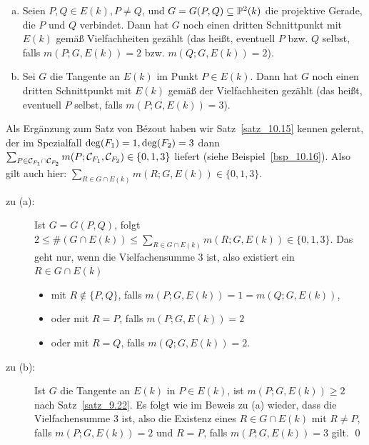 \begin{satz}
\label{satz_13.1}
	\begin{enumerate}[(a)]
		\item Seien $P,Q \in E(k), P \neq Q$, und $G=G(P,Q) \subseteq \mathbb{P}^2(k)$ die projektive Gerade, die $P$ und $Q$ verbindet. 
		Dann hat $G$ noch einen dritten Schnittpunkt mit $E(k)$ gemäß Vielfachheiten gezählt (das heißt, eventuell $P$ bzw. $Q$ selbst, falls $m(P;G,E(k)) = 2$ bzw. $m(Q;G,E(k)) = 2$).
		\item Sei $G$ die Tangente an $E(k)$ im Punkt $P \in E(k)$. 
		Dann hat $G$ noch einen dritten Schnittpunkt mit $E(k)$ gemäß der Vielfachheiten gezählt (das heißt, eventuell $P$ selbst, falls $m(P;G,E(k)) = 3$).
	\end{enumerate}
\end{satz}

\begin{bew}
	Als Ergänzung zum Satz von Bézout haben wir Satz~\ref{satz_10.15} kennen gelernt, der im Spezialfall $\deg(F_1) = 1,\linebreak \deg(F_2) = 3$ dann $\sum_{P \in \mathcal{C}_{F_1} \cap \mathcal{C}_{F_2}} m(P;\mathcal{C}_{F_1},\mathcal{C}_{F_2}) \in \{0,1,3\}$ liefert (siehe Beispiel~\ref{bsp_10.16}). 
	Also gilt auch hier: \linebreak $\sum_{R \in G \cap E(k)} m(R;G,E(k)) \in \{0,1,3\}$.
	\begin{description}
		\item[zu (a):] Ist $G = G(P,Q)$, folgt $2 \leq  \#(G \cap E(k)) \leq \sum_{R \in G \cap E(k)} m(R;G,E(k)) \in \{0,1,3\}$. 
		Das geht nur, wenn die Vielfachensumme $3$ ist, also existiert ein $R \in G \cap E(k)$ \begin{itemize}
			\item mit $R \notin \{P,Q\}$, falls $m(P;G,E(k)) = 1 = m(Q;G,E(k))$,
			\item oder mit $R = P$, falls $m(P;G,E(k)) = 2$
			\item oder mit $R = Q$, falls $m(Q;G,E(k)) = 2$.
		\end{itemize} 
		\item[zu (b):] Ist $G$ die Tangente an $E(k)$ in $P \in E(k)$, ist $m(P;G,E(k)) \geq 2$ nach Satz~\ref{satz_9.22}. 
		Es folgt wie im Beweis zu (a) wieder, dass die Vielfachensumme $3$ ist, also die Existenz eines $R \in G \cap E(k)$ mit $R \neq P$, falls $m(P;G,E(k)) = 2$ und $R = P$, falls $m(P;G,E(k)) = 3$ gilt. \qed
	\end{description}
\end{bew}

